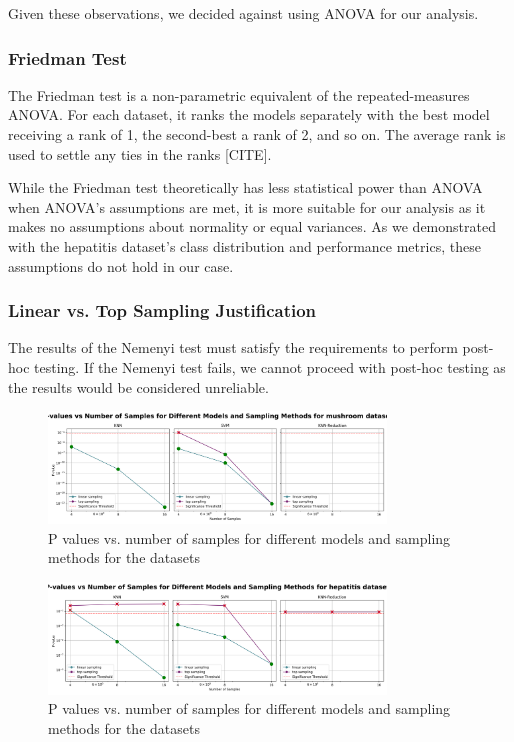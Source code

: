 Given these observations, we decided against using ANOVA for our analysis.

\subsubsection{Friedman Test}
The Friedman test is a non-parametric equivalent of the repeated-measures ANOVA. 
For each dataset, it ranks the models separately with the best model receiving a rank of 1, the second-best a rank of 2, and so on.
The average rank is used to settle any ties in the ranks [CITE].

While the Friedman test theoretically has less statistical power than ANOVA when ANOVA's assumptions are met,
it is more suitable for our analysis as it makes no assumptions about normality or equal variances.
As we demonstrated with the hepatitis dataset's class distribution and performance metrics, these assumptions do not hold in our case.

\subsubsection{Linear vs. Top Sampling Justification}
The results of the Nemenyi test must satisfy the requirements to perform post-hoc testing.
If the Nemenyi test fails, we cannot proceed with post-hoc testing as the results would be considered unreliable.

\begin{figure}[!ht]
    \centering
    \includegraphics[width=0.8\textwidth]{figures/p_values_vs_num_samples_mushroom.png}
    \caption{P values vs. number of samples for different models and sampling methods for the datasets}
\label{fig:p_values_vs_num_samples_mushroom}
\end{figure}

\begin{figure}[!ht]
    \centering
    \includegraphics[width=0.8\textwidth]{figures/p_values_vs_num_samples_hepatitis.png}
    \caption{P values vs. number of samples for different models and sampling methods for the datasets}
\label{fig:p_values_vs_num_samples_hepatitis}
\end{figure}

